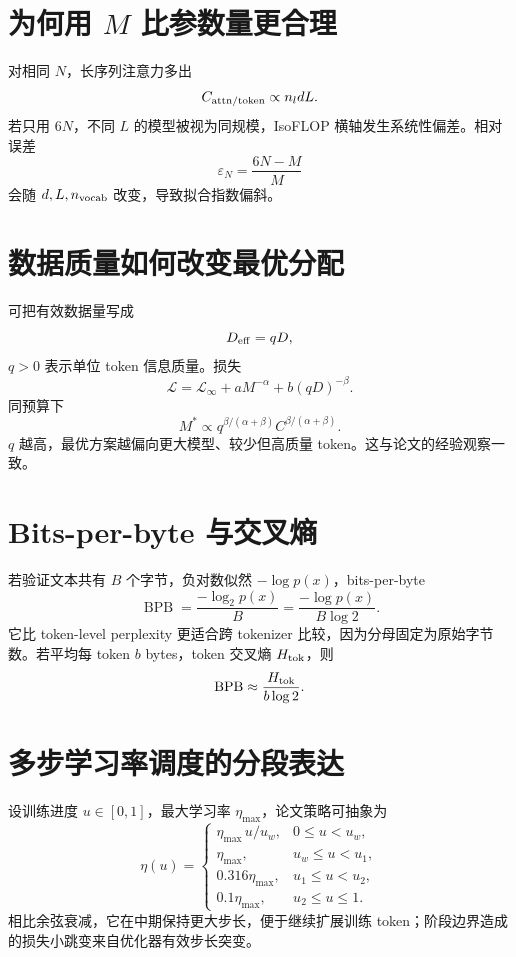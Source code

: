 \documentclass[UTF8,12pt,a4paper,fontset=none]{ctexart}
\numberwithin{equation}{section}
\newcommand{\Loss}{\mathcal{L}}
\begin{document}
\section{为何用 $M$ 比参数量更合理}
对相同 $N$，长序列注意力多出
\begin{equation}
 C_{\rm attn/token}\propto n_ldL.
\end{equation}
若只用 $6N$，不同 $L$ 的模型被视为同规模，IsoFLOP 横轴发生系统性偏差。相对误差
\begin{equation}
 \varepsilon_N=\frac{6N-M}{M}
\end{equation}
会随 $d,L,n_{\rm vocab}$ 改变，导致拟合指数偏斜。

\section{数据质量如何改变最优分配}
可把有效数据量写成
\begin{equation}
 D_{\rm eff}=qD,
\end{equation}
$q>0$ 表示单位 token 信息质量。损失
\begin{equation}
 \Loss=\Loss_\infty+aM^{-\alpha}+b(qD)^{-\beta}.
\end{equation}
同预算下
\begin{equation}
 M^*\propto q^{\beta/(\alpha+\beta)}C^{\beta/(\alpha+\beta)}.
\end{equation}
$q$ 越高，最优方案越偏向更大模型、较少但高质量 token。这与论文的经验观察一致。

\section{Bits-per-byte 与交叉熵}
若验证文本共有 $B$ 个字节，负对数似然 $-\log p(x)$，bits-per-byte
\begin{equation}
 \operatorname{BPB}=\frac{-\log_2p(x)}{B}
 =\frac{-\log p(x)}{B\log2}.
\end{equation}
它比 token-level perplexity 更适合跨 tokenizer 比较，因为分母固定为原始字节数。若平均每 token $b$ bytes，token 交叉熵 $H_{\rm tok}$，则
\begin{equation}
 \operatorname{BPB}\approx\frac{H_{\rm tok}}{b\log2}.
\end{equation}

\section{多步学习率调度的分段表达}
设训练进度 $u\in[0,1]$，最大学习率 $\eta_{\max}$，论文策略可抽象为
\begin{equation}
 \eta(u)=\begin{cases}
 \eta_{\max}\,u/u_w,&0\le u<u_w,\\
 \eta_{\max},&u_w\le u<u_1,\\
 0.316\eta_{\max},&u_1\le u<u_2,\\
 0.1\eta_{\max},&u_2\le u\le1.
 \end{cases}
\end{equation}
相比余弦衰减，它在中期保持更大步长，便于继续扩展训练 token；阶段边界造成的损失小跳变来自优化器有效步长突变。
\end{document}
